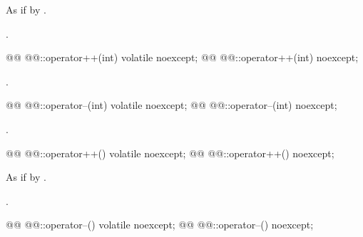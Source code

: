 \begin{itemdescr}
\pnum
\effects As if by .

\pnum
\returns {}.
\end{itemdescr}

%
%
\begin{itemdecl}
@@ @@::operator++(int) volatile noexcept;
@@ @@::operator++(int) noexcept;
\end{itemdecl}

\begin{itemdescr}
\pnum
\returns {}.
\end{itemdescr}

%
%
\begin{itemdecl}
@@ @@::operator--(int) volatile noexcept;
@@ @@::operator--(int) noexcept;
\end{itemdecl}

\begin{itemdescr}
\pnum
\returns {}.
\end{itemdescr}

%
%
\begin{itemdecl}
@@ @@::operator++() volatile noexcept;
@@ @@::operator++() noexcept;
\end{itemdecl}

\begin{itemdescr}
\pnum
\effects As if by .

\pnum
\returns {}.
\end{itemdescr}

%
%
\begin{itemdecl}
@@ @@::operator--() volatile noexcept;
@@ @@::operator--() noexcept;
\end{itemdecl}

